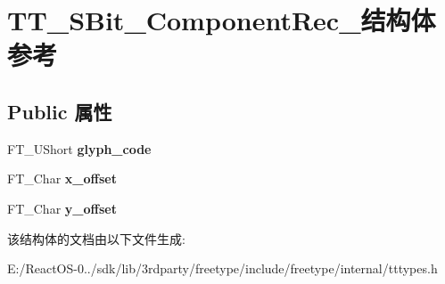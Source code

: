 \hypertarget{struct_t_t___s_bit___component_rec__}{}\section{T\+T\+\_\+\+S\+Bit\+\_\+\+Component\+Rec\+\_\+结构体 参考}
\label{struct_t_t___s_bit___component_rec__}
\subsection*{Public 属性}
\begin{DoxyCompactItemize}
\item 
\mbox{\label{struct_t_t___s_bit___component_rec___a357eef9c05c65034b506cdd48271e562}} 
F\+T\+\_\+\+U\+Short {\bfseries glyph\+\_\+code}
\item 
\mbox{\label{struct_t_t___s_bit___component_rec___a97799704aa59bf737e274289fa70ca3f}} 
F\+T\+\_\+\+Char {\bfseries x\+\_\+offset}
\item 
\mbox{\label{struct_t_t___s_bit___component_rec___af24f91b7d5e0268a223514ad68a9a10b}} 
F\+T\+\_\+\+Char {\bfseries y\+\_\+offset}
\end{DoxyCompactItemize}


该结构体的文档由以下文件生成\+:\begin{DoxyCompactItemize}
\item 
E\+:/\+React\+O\+S-\/0../sdk/lib/3rdparty/freetype/include/freetype/internal/tttypes.\+h\end{DoxyCompactItemize}
